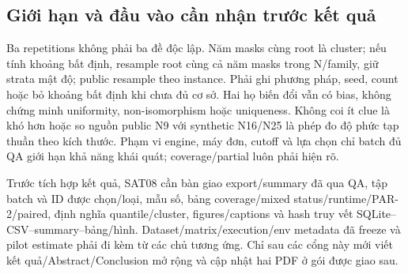 \subsection{Giới hạn và đầu vào cần nhận trước kết quả}
Ba repetitions không phải ba đề độc lập. Năm masks cùng root là cluster;
nếu tính khoảng bất định, resample root cùng cả năm masks trong N/family,
giữ strata mật độ; public resample theo instance. Phải ghi phương pháp, seed,
count hoặc bỏ khoảng bất định khi chưa đủ cơ sở. Hai họ biến đổi vẫn có bias,
không chứng minh uniformity, non-isomorphism hoặc uniqueness. Không coi ít
clue là khó hơn hoặc so nguồn public N9 với synthetic N16/N25 là phép đo
độ phức tạp thuần theo kích thước. Phạm vi engine, máy đơn, cutoff và lựa chọn
chỉ batch đủ QA giới hạn khả năng khái quát; coverage/partial luôn phải hiện rõ.

Trước tích hợp kết quả, SAT08 cần bàn giao export/summary đã qua QA, tập batch
và ID được chọn/loại, mẫu số, bảng coverage/mixed status/runtime/PAR-2/paired,
định nghĩa quantile/cluster, figures/captions và hash truy vết
SQLite--CSV--summary--bảng/hình. Dataset/matrix/execution/env metadata đã freeze
và pilot estimate phải đi kèm từ các chủ tương ứng. Chỉ sau các cổng này mới
viết kết quả/Abstract/Conclusion mở rộng và cập nhật hai PDF ở gói được giao sau.
